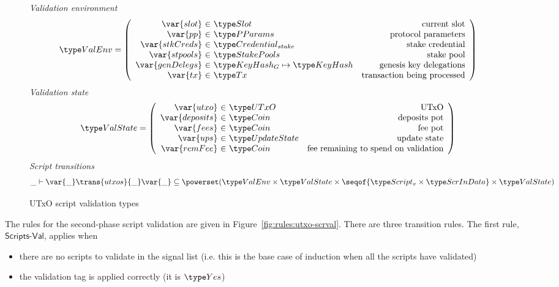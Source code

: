 \begin{figure}[htb]
  \emph{Validation environment}
  \begin{equation*}
    \ValEnv =
    \left(
      \begin{array}{r@{~\in~}lr}
        \var{slot} & \Slot & \text{current slot}\\
        \var{pp} & \PParams & \text{protocol parameters}\\
        \var{stkCreds} & \StakeCredential & \text{stake credential}\\
        \var{stpools} & \StakePools & \text{stake pool}\\
        \var{genDelegs} & \KeyHashGen\mapsto\KeyHash & \text{genesis key delegations} \\
        \var{tx} & \Tx & \text{transaction being processed} \\
      \end{array}
    \right)
  \end{equation*}
  \emph{Validation state}
  \begin{equation*}
    \ValState =
    \left(
      \begin{array}{r@{~\in~}lr}
        \var{utxo} & \UTxO & \text{UTxO}\\
        \var{deposits} & \Coin & \text{deposits pot}\\
        \var{fees} & \Coin & \text{fee pot}\\
        \var{ups} & \UpdateState & \text{update state}\\
        \var{remFee} & \Coin & \text{fee remaining to spend on validation} \\
      \end{array}
    \right)
  \end{equation*}
  \emph{Script transitions}
  \begin{equation*}
    \_ \vdash
    \var{\_} \trans{utxos}{\_} \var{\_}
    \subseteq \powerset (\ValEnv \times \ValState \times \seqof{\ScriptV\times\ScrInData} \times \ValState)
  \end{equation*}
  \caption{UTxO script validation types}
  \label{fig:ts-types:utxo-scripts}
\end{figure}

The rules for the second-phase script validation are given in
Figure~\ref{fig:rules:utxo-scrval}. There are three transition rules.
The first rule, $\mathsf{Scripts\mbox{-}Val}$, applies when

\begin{itemize}
\item there
are no scripts to validate in the signal list (i.e. this is the base case of
induction when all the scripts have validated)
\item the validation tag is applied correctly (it is $\Yes$)
\end{itemize}

